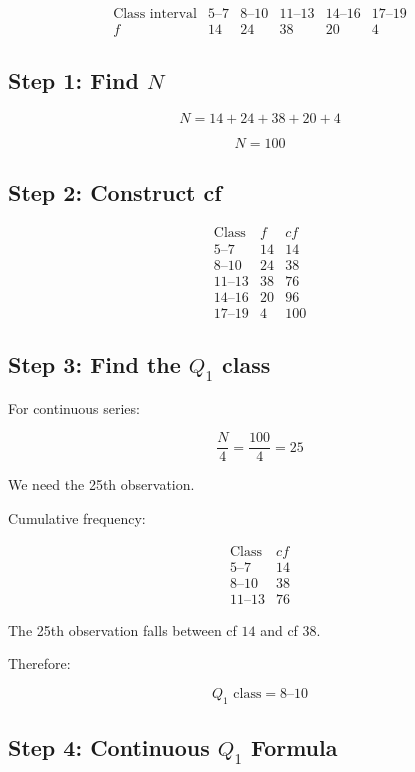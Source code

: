 \documentclass[12pt,a4paper]{article}
\begin{document}
\[
\begin{array}{c|ccccc}
\text{Class interval}
&5\text{--}7&8\text{--}10&11\text{--}13&14\text{--}16&17\text{--}19\\
\hline
f&14&24&38&20&4
\end{array}
\]

\subsection*{Step 1: Find $N$}

\[
N=14+24+38+20+4
\]

\[
\boxed{N=100}
\]

\subsection*{Step 2: Construct cf}

\[
\begin{array}{c|c|c}
\text{Class}&f&cf\\
\hline
5\text{--}7&14&14\\
8\text{--}10&24&38\\
11\text{--}13&38&76\\
14\text{--}16&20&96\\
17\text{--}19&4&100
\end{array}
\]

\subsection*{Step 3: Find the $Q_1$ class}

For continuous series:

\[
\frac N4=\frac{100}{4}=25
\]

We need the 25th observation.

Cumulative frequency:

\[
\begin{array}{c|c}
\text{Class}&cf\\
\hline
5\text{--}7&14\\
8\text{--}10&38\\
11\text{--}13&76
\end{array}
\]

The 25th observation falls between cf $14$ and cf $38$.

Therefore:

\[
\boxed{Q_1\text{ class}=8\text{--}10}
\]

\subsection*{Step 4: Continuous $Q_1$ Formula}
\end{document}
